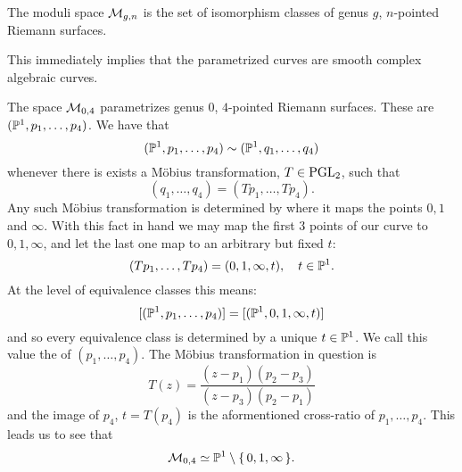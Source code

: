 \documentclass[12pt]{memoir}
\begin{document}
\begin{Def}
    The moduli space $\mathcal{M}_{g,n}$ is the set of isomorphism classes of genus $g$, $n$-pointed Riemann surfaces.
\end{Def}

\begin{Rmk}
This immediately implies that the parametrized curves are smooth complex algebraic curves.
\end{Rmk}

\begin{Ex}
    The space $\mathcal{M}_{0,4}$ parametrizes genus $0$, $4$-pointed Riemann surfaces. These are $(\mathbb{P}^1,p_1,\dots,p_4)$. We have that 
    $$(\mathbb{P}^1,p_1,\dots,p_4)\sim(\mathbb{P}^1,q_1,\dots,q_4)$$
    whenever there is exists a Möbius transformation, $T\in\operatorname{PGL}_2$, such that 
    $$(q_1,\dots,q_4)=(Tp_1,\dots,Tp_4).$$
    Any such Möbius transformation is determined by where it maps the points $0,1$ and $\infty$. With this fact in hand we may map the first $3$ points of our curve to $0,1,\infty$, and let the last one map to an arbitrary but fixed $t$:
    $$(Tp_1,\dots,Tp_4)=(0,1,\infty,t),\quad t\in\mathbb{P}^1.$$
    At the level of equivalence classes this means:
    $$[(\mathbb{P}^1,p_1,\dots,p_4)]=[(\mathbb{P}^1,0,1,\infty,t)]$$
    and so every equivalence class is determined by a unique $t\in\mathbb{P}^1$. We call this value the  of $(p_1,\dots,p_4)$. The Möbius transformation in question is
    $$T(z)=\frac{(z-p_1)(p_2-p_3)}{(z-p_3)(p_2-p_1)}$$
    and the image of $p_4$, $t=T(p_4)$ is the aformentioned cross-ratio of $p_1,\dots,p_4$. This leads us to see that 
    $$\mathcal{M}_{0,4}\simeq\mathbb{P}^1\setminus\{\,0,1,\infty\,\}.$$
\end{Ex}
\end{document}
